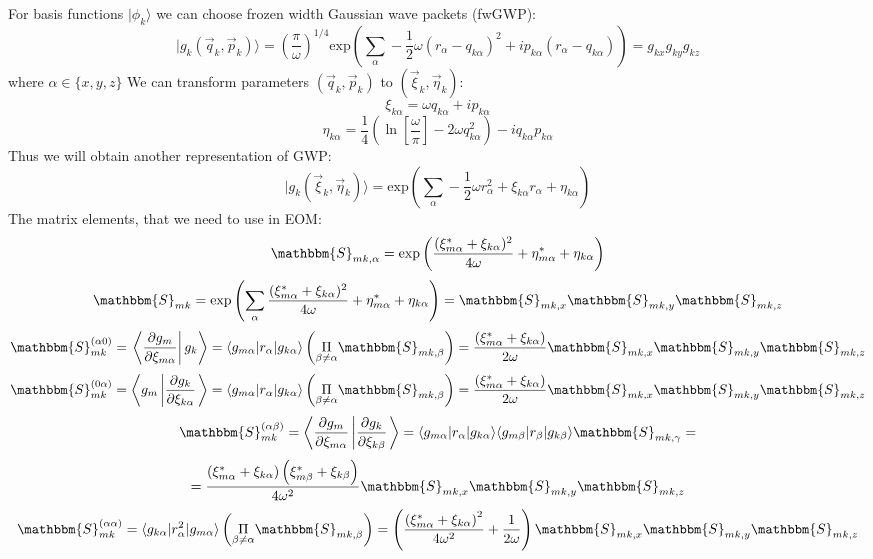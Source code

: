 For basis functions $|\phi_k\rangle$ we can choose frozen width Gaussian wave packets (fwGWP):
$$|g_k(\vec{q}_{k},\vec{p}_{k})\rangle = \left(\frac{\pi}{\omega}\right)^{1/4} \text{exp}\left(\sum_{\alpha}-\frac{1}{2}\omega(r_{\alpha}-q_{k\alpha})^2+%
									 ip_{k\alpha}(r_{\alpha}-q_{k\alpha})\right)=g_{kx}g_{ky}g_{kz}$$
where $\alpha \in \{x,y,z\}$
We can transform parameters $(\vec{q}_k,\vec{p}_k)$ to $(\vec{\xi}_k,\vec{\eta}_k)$:
$$\xi_{k\alpha} = \omega q_{k\alpha}+i p_{k\alpha}$$
$$\eta_{k\alpha} = \frac{1}{4}\left(\ln\left[{\frac{\omega}{\pi}}\right]-2\omega q_{k\alpha}^2\right)-iq_{k\alpha}p_{k\alpha}$$
Thus we will obtain another representation of GWP:
$$|g_k(\vec{\xi}_k,\vec{\eta}_k)\rangle=\text{exp}\left(\sum_{\alpha}-\frac{1}{2}\omega r_{\alpha}^2+\xi_{k\alpha}r_{\alpha}+\eta_{k\alpha}\right)$$
The matrix elements, that we need to use in EOM:
$$\mathbbm{S}_{mk,\alpha}=\text{exp}\left(\frac{(\xi_{m\alpha}^*+\xi_{k\alpha})^2}{4\omega}+\eta_{m\alpha}^*+\eta_{k\alpha} \right)$$
$$\mathbbm{S}_{mk} = \text{exp}\left(\sum_{\alpha} \frac{(\xi_{m\alpha}^*+\xi_{k\alpha})^2}{4\omega}+\eta_{m\alpha}^*+\eta_{k\alpha}\right)=%
  \mathbbm{S}_{mk,x}\mathbbm{S}_{mk,y}\mathbbm{S}_{mk,z}$$
$$\mathbbm{S}_{mk}^{(\alpha0)}=\left.\left\langle\frac{\partial g_m}{\partial\xi_{m\alpha}}\right|g_k\right\rangle=%
  \langle g_{m\alpha}|r_{\alpha}|g_{k\alpha}\rangle\left(\underset{\beta\neq\alpha}{\Pi}\mathbbm{S}_{mk,\beta}\right)=%
  \frac{\left(\xi_{m\alpha}^*+\xi_{k\alpha}\right)}{2\omega}\mathbbm{S}_{mk,x}\mathbbm{S}_{mk,y}\mathbbm{S}_{mk,z}$$
$$\mathbbm{S}_{mk}^{(0\alpha)}=\left\langle g_m\left|\frac{\partial g_k}{\partial\xi_{k\alpha}}\right.\right\rangle=%
  \langle g_{m\alpha}|r_{\alpha}|g_{k\alpha}\rangle\left(\underset{\beta\neq\alpha}{\Pi}\mathbbm{S}_{mk,\beta}\right)=%
  \frac{\left(\xi_{m\alpha}^*+\xi_{k\alpha}\right)}{2\omega}\mathbbm{S}_{mk,x}\mathbbm{S}_{mk,y}\mathbbm{S}_{mk,z}$$
$$\mathbbm{S}_{mk}^{(\alpha\beta)}=\left\langle\frac{\partial g_m}{\partial\xi_{m\alpha}}\left|\frac{\partial g_k}{\partial\xi_{k\beta}}\right.\right\rangle=%
  \langle g_{m\alpha}|r_{\alpha}|g_{k\alpha}\rangle\langle g_{m\beta}|r_{\beta}|g_{k\beta}\rangle\mathbbm{S}_{mk,\gamma}=$$
$$=\frac{\left(\xi_{m\alpha}^*+\xi_{k\alpha}\right)\left(\xi_{m\beta}^*+\xi_{k\beta}\right)}{4\omega^2}\mathbbm{S}_{mk,x}\mathbbm{S}_{mk,y}\mathbbm{S}_{mk,z}$$
$$\mathbbm{S}_{mk}^{(\alpha\alpha)}=\langle g_{k\alpha}|r_{\alpha}^2|g_{m\alpha}\rangle\left(\underset{\beta\neq\alpha}{\Pi}\mathbbm{S}_{mk,\beta}\right)=%
  \left(\frac{\left(\xi_{m\alpha}^*+\xi_{k\alpha}\right)^2}{4\omega^2}+\frac{1}{2\omega}\right)\mathbbm{S}_{mk,x}\mathbbm{S}_{mk,y}\mathbbm{S}_{mk,z}$$
